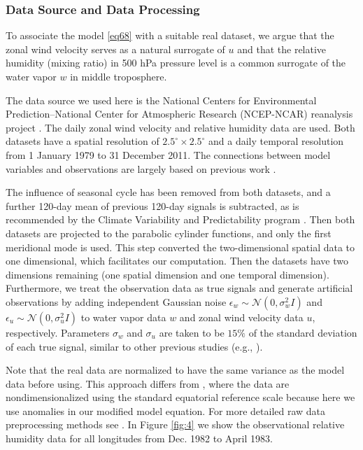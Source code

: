 \documentclass[article,ij4uq]{ij4uq}              %
\begin{document}
\subsubsection{Data Source and Data Processing}\label{sec:521}
\par To associate the model \eqref{eq68} with a suitable real dataset, we argue that the zonal wind velocity serves as a natural surrogate of $u$ and that the relative humidity (mixing ratio) in 500 hPa pressure level is a common surrogate of the water vapor $w$ in middle troposphere. 

\par The data source we used here is the National Centers for Environmental Prediction–National Center for Atmospheric Research (NCEP\--NCAR) reanalysis project \cite{kalnay1996ncep}. The daily zonal wind velocity and relative humidity data are used. Both datasets have a spatial resolution of $2.5^{\circ}\times2.5^{\circ}$ and a daily temporal resolution from 1 January 1979 to 31 December 2011. The connections between model variables and observations are largely based on previous work \cite{stechmann2014walker,stechmann2015identifying,ogrosky2016identifying}.

\par The influence of seasonal cycle has been removed from both datasets, and a further 120-day mean of previous 120-day signals is subtracted, as is recommended by the Climate Variability and Predictability program \cite{waliser2009mjo}. Then both datasets are projected to the parabolic cylinder functions, and only the first meridional mode is used. This step converted the two-dimensional spatial data to one dimensional, which facilitates our computation. Then the datasets have two dimensions remaining (one spatial dimension and one temporal dimension). Furthermore, we treat the observation data as true signals and generate artificial observations by adding independent Gaussian noise $\epsilon_{w}\sim \mathcal{N}(0,\sigma_{w}^{2}I)$ and $\epsilon_{u}\sim \mathcal{N}(0,\sigma_{u}^{2}I)$ to water vapor data $w$ and zonal wind velocity data $u$, respectively. Parameters $\sigma_{w}$ and $\sigma_{u}$ are taken to be $15\%$ of the standard deviation of each true signal, similar to other previous studies (e.g., \cite{chen2016filtering}).

\par Note that the real data are normalized to have the same variance as the model data before using. This approach differs from \cite{stechmann2017unified}, where the data are nondimensionalized using the standard equatorial reference scale \cite{stechmann2015identifying} because here we use anomalies in our modified model equation. For more detailed raw data preprocessing methods see \cite{stechmann2015identifying}. In Figure \ref{fig:4} we show the observational relative humidity data for all longitudes from Dec. 1982 to April 1983.
\end{document}
